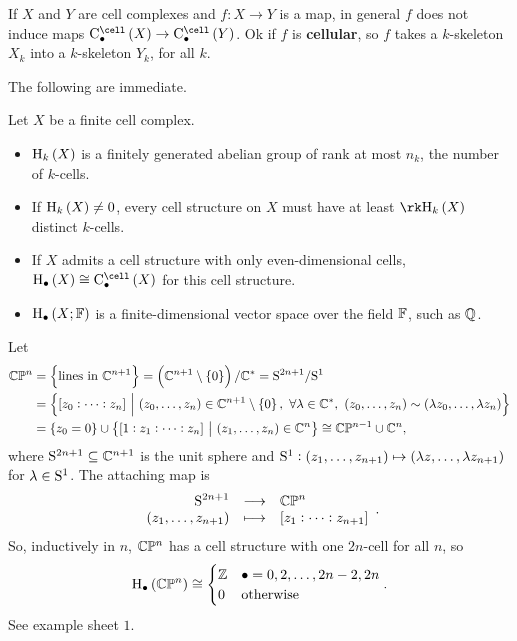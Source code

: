\begin{remark*}
If $ X $ and $ Y $ are cell complexes and $ f : X \to Y $ is a map, in general $ f $ does not induce maps $ \C_\bullet^{\cell}\br{X} \to \C_\bullet^{\cell}\br{Y} $. Ok if $ f $ is \textbf{cellular}, so $ f $ takes a $ k $-skeleton $ X_k $ into a $ k $-skeleton $ Y_k $, for all $ k $.
\end{remark*}

The following are immediate.

\begin{corollary}
Let $ X $ be a finite cell complex.
\begin{itemize}
\item $ \H_k\br{X} $ is a finitely generated abelian group of rank at most $ n_k $, the number of $ k $-cells.
\item If $ \H_k\br{X} \ne 0 $, every cell structure on $ X $ must have at least $ \rk \H_k\br{X} $ distinct $ k $-cells.
\item If $ X $ admits a cell structure with only even-dimensional cells, $ \H_\bullet\br{X} \cong \C_\bullet^{\cell}\br{X} $ for this cell structure.
\item $ \H_\bullet\br{X; \FF} $ is a finite-dimensional vector space over the field $ \FF $, such as $ \QQ $.
\end{itemize}
\end{corollary}

\begin{example*}
Let
\begin{align*}
\CC\PP^n
& = \cbr{\text{lines in} \ \CC^{n + 1}}
= \br{\CC^{n + 1} \setminus \cbr{0}} / \CC^*
= \S^{2n + 1} / \S^1 \\
& = \cbr{\sbr{z_0 : \dots : z_n} \st \br{z_0, \dots, z_n} \in \CC^{n + 1} \setminus \cbr{0}, \ \forall \lambda \in \CC^*, \ \br{z_0, \dots, z_n} \sim \br{\lambda z_0, \dots, \lambda z_n}} \\
& = \cbr{z_0 = 0} \cup \cbr{\sbr{1 : z_1 : \dots : z_n} \st \br{z_1, \dots, z_n} \in \CC^n}
\cong \CC\PP^{n - 1} \cup \CC^n,
\end{align*}
where $ \S^{2n + 1} \subseteq \CC^{n + 1} $ is the unit sphere and $ \S^1 : \br{z_1, \dots, z_{n + 1}} \mapsto \br{\lambda z, \dots, \lambda z_{n + 1}} $ for $ \lambda \in \S^1 $. The attaching map is
$$ \function{\S^{2n + 1}}{\CC\PP^n}{\br{z_1, \dots, z_{n + 1}}}{\sbr{z_1 : \dots : z_{n + 1}}}. $$
So, inductively in $ n $, $ \CC\PP^n $ has a cell structure with one $ 2n $-cell for all $ n $, so
$$ \H_\bullet\br{\CC\PP^n} \cong
\begin{cases}
\ZZ & \bullet = 0, 2, \dots, 2n - 2, 2n \\
0 & \text{otherwise}
\end{cases}.
$$
See example sheet $ 1 $.
\end{example*}

